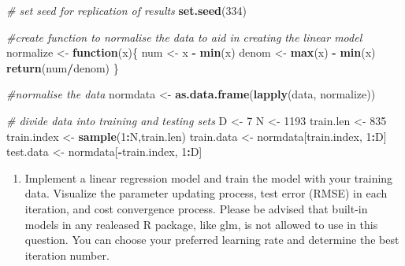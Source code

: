 \documentclass[
]{article}
\newenvironment{Shaded}{\begin{snugshade}}{\end{snugshade}}
\newcommand{\CommentTok}[1]{\textcolor[rgb]{0.56,0.35,0.01}{\textit{#1}}}
\newcommand{\ControlFlowTok}[1]{\textcolor[rgb]{0.13,0.29,0.53}{\textbf{#1}}}
\newcommand{\DecValTok}[1]{\textcolor[rgb]{0.00,0.00,0.81}{#1}}
\newcommand{\KeywordTok}[1]{\textcolor[rgb]{0.13,0.29,0.53}{\textbf{#1}}}
\newcommand{\NormalTok}[1]{#1}
\newcommand{\OperatorTok}[1]{\textcolor[rgb]{0.81,0.36,0.00}{\textbf{#1}}}
\newcommand{\StringTok}[1]{\textcolor[rgb]{0.31,0.60,0.02}{#1}}
\providecommand{\tightlist}{%
  \setlength{\itemsep}{0pt}\setlength{\parskip}{0pt}}
\begin{document}
\begin{Shaded}
\begin{Highlighting}[]
\CommentTok{# set seed for replication of results }
\KeywordTok{set.seed}\NormalTok{(}\DecValTok{334}\NormalTok{)}

\CommentTok{#create function to normalise the data to aid in creating the linear model }
\NormalTok{normalize <-}\StringTok{ }\ControlFlowTok{function}\NormalTok{(x)\{}
\NormalTok{  num <-}\StringTok{ }\NormalTok{x }\OperatorTok{-}\StringTok{ }\KeywordTok{min}\NormalTok{(x)}
\NormalTok{  denom <-}\StringTok{ }\KeywordTok{max}\NormalTok{(x) }\OperatorTok{-}\StringTok{ }\KeywordTok{min}\NormalTok{(x)}
  \KeywordTok{return}\NormalTok{(num}\OperatorTok{/}\NormalTok{denom)}
\NormalTok{\}}

\CommentTok{#normalise the data }
\NormalTok{normdata <-}\StringTok{ }\KeywordTok{as.data.frame}\NormalTok{(}\KeywordTok{lapply}\NormalTok{(data, normalize))}

\CommentTok{# divide data into training and testing sets}
\NormalTok{D <-}\StringTok{ }\DecValTok{7}
\NormalTok{N <-}\StringTok{ }\DecValTok{1193}
\NormalTok{train.len <-}\StringTok{ }\DecValTok{835}
\NormalTok{train.index <-}\StringTok{ }\KeywordTok{sample}\NormalTok{(}\DecValTok{1}\OperatorTok{:}\NormalTok{N,train.len)}
\NormalTok{train.data <-}\StringTok{ }\NormalTok{normdata[train.index,  }\DecValTok{1}\OperatorTok{:}\NormalTok{D]}
\NormalTok{test.data <-}\StringTok{ }\NormalTok{normdata[}\OperatorTok{-}\NormalTok{train.index, }\DecValTok{1}\OperatorTok{:}\NormalTok{D]}
\end{Highlighting}
\end{Shaded}

\begin{enumerate}
\def\labelenumi{\arabic{enumi}.}
\setcounter{enumi}{2}
\tightlist
\item
  Implement a linear regression model and train the model with your
  training data. Visualize the parameter updating process, test error
  (RMSE) in each iteration, and cost convergence process. Please be
  advised that built-in models in any realeased R package, like glm, is
  not allowed to use in this question. You can choose your preferred
  learning rate and determine the best iteration number.
\end{enumerate}
\end{document}
